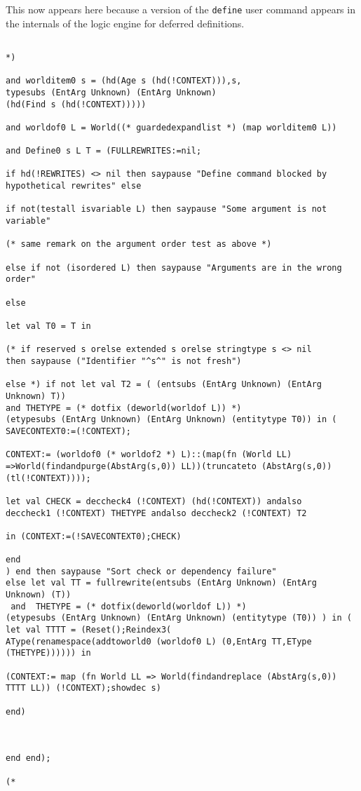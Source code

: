 \documentclass{article}
\begin{document}
This now appears here because a version of the {\tt define} user command appears in the internals of the logic engine for deferred definitions.

\begin{verbatim}

*)
   
and worlditem0 s = (hd(Age s (hd(!CONTEXT))),s,
typesubs (EntArg Unknown) (EntArg Unknown) 
(hd(Find s (hd(!CONTEXT)))))

and worldof0 L = World((* guardedexpandlist *) (map worlditem0 L))

and Define0 s L T = (FULLREWRITES:=nil;

if hd(!REWRITES) <> nil then saypause "Define command blocked by hypothetical rewrites" else

if not(testall isvariable L) then saypause "Some argument is not variable"

(* same remark on the argument order test as above *)

else if not (isordered L) then saypause "Arguments are in the wrong order"

else 

let val T0 = T in

(* if reserved s orelse extended s orelse stringtype s <> nil 
then saypause ("Identifier "^s^" is not fresh")

else *) if not let val T2 = ( (entsubs (EntArg Unknown) (EntArg Unknown) T))
and THETYPE = (* dotfix (deworld(worldof L)) *)
(etypesubs (EntArg Unknown) (EntArg Unknown) (entitytype T0)) in (
SAVECONTEXT0:=(!CONTEXT); 

CONTEXT:= (worldof0 (* worldof2 *) L)::(map(fn (World LL) =>World(findandpurge(AbstArg(s,0)) LL))(truncateto (AbstArg(s,0))(tl(!CONTEXT))));  

let val CHECK = deccheck4 (!CONTEXT) (hd(!CONTEXT)) andalso 
deccheck1 (!CONTEXT) THETYPE andalso deccheck2 (!CONTEXT) T2

in (CONTEXT:=(!SAVECONTEXT0);CHECK) 

end
) end then saypause "Sort check or dependency failure"
else let val TT = fullrewrite(entsubs (EntArg Unknown) (EntArg Unknown) (T))
 and  THETYPE = (* dotfix(deworld(worldof L)) *)
(etypesubs (EntArg Unknown) (EntArg Unknown) (entitytype (T0)) ) in (
let val TTTT = (Reset();Reindex3(
AType(renamespace(addtoworld0 (worldof0 L) (0,EntArg TT,EType (THETYPE)))))) in

(CONTEXT:= map (fn World LL => World(findandreplace (AbstArg(s,0)) TTTT LL)) (!CONTEXT);showdec s)

end)



end end);

(*

\end{verbatim}
\end{document}
